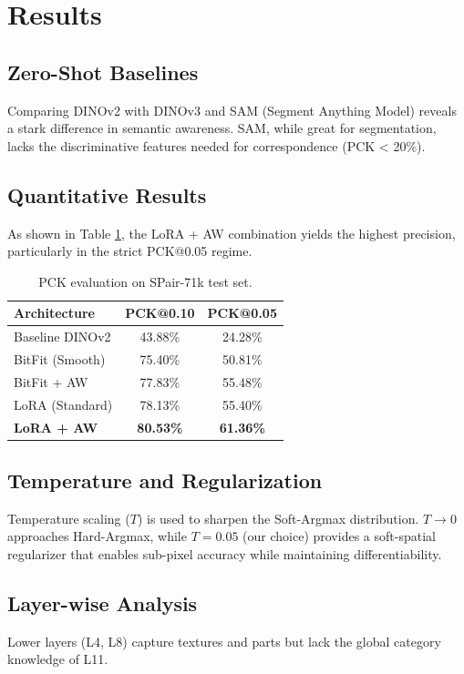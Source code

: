 \documentclass[10pt,twocolumn,letterpaper]{article}
\begin{document}
\section{Results}
\subsection{Zero-Shot Baselines}
Comparing DINOv2 with DINOv3 and SAM (Segment Anything Model) reveals a stark difference in semantic awareness. SAM, while great for segmentation, lacks the discriminative features needed for correspondence (PCK < 20\%).

\subsection{Quantitative Results}
As shown in Table \ref{tab:pck}, the LoRA + AW combination yields the highest precision, particularly in the strict PCK@0.05 regime.

\begin{table}[h]
\centering
\caption{PCK evaluation on SPair-71k test set.}
\label{tab:pck}
\begin{tabular}{@{}lcc@{}}
\toprule
Architecture & PCK@0.10 & PCK@0.05 \\ \midrule
Baseline DINOv2 & 43.88\% & 24.28\% \\
BitFit (Smooth) & 75.40\% & 50.81\% \\
BitFit + AW & 77.83\% & 55.48\% \\
LoRA (Standard)  & 78.13\% & 55.40\% \\
\textbf{LoRA + AW} & \textbf{80.53\%} & \textbf{61.36\%} \\ \bottomrule
\end{tabular}
\end{table}

\subsection{Temperature and Regularization}
Temperature scaling ($T$) is used to sharpen the Soft-Argmax distribution. $T \to 0$ approaches Hard-Argmax, while $T=0.05$ (our choice) provides a soft-spatial regularizer that enables sub-pixel accuracy while maintaining differentiability.

\subsection{Layer-wise Analysis} \label{sec:layerwise}
Lower layers (L4, L8) capture textures and parts but lack the global category knowledge of L11.
\end{document}
